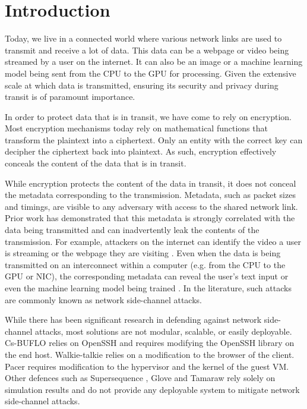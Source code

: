 
\chapter{Introduction}
\label{ch:Introduction}

Today, we live in a connected world where various network links are used to transmit and receive a lot of data. 
This data can be a webpage or video being streamed by a user on the internet. 
It can also be an image or a machine learning model being sent from the CPU to the GPU for processing. 
Given the extensive scale at which data is transmitted, ensuring its security and privacy during transit is of paramount importance.

In order to protect data that is in transit, we have come to rely on encryption. 
Most encryption mechanisms today rely on mathematical functions that transform the plaintext into a ciphertext. 
Only an entity with the correct key can decipher the ciphertext back into plaintext. 
As such, encryption effectively conceals the content of the data that is in transit.

While encryption protects the content of the data in transit, it does not conceal the metadata corresponding to the transmission.
Metadata, such as packet sizes and timings, are visible to any adversary with access to the shared network link.
Prior work has demonstrated that this metadata is strongly correlated with the data being transmitted and can inadvertently leak the contents of the transmission.
For example, attackers on the internet can identify the video a user is streaming \cite{schuster2017beautyburst} or the webpage they are visiting \cite{gong2010fingerprinting, wang2014supersequence}.
Even when the data is being transmitted on an interconnect within a computer (e.g. from the CPU to the GPU or NIC), the corresponding metadata can reveal the user's text input or even the machine learning model being trained \cite{tan2021invisible}.
In the literature, such attacks are commonly known as network side-channel attacks.

While there has been significant research in defending against network side-channel attacks, most solutions are not modular, scalable, or easily deployable.
Cs-BUFLO \cite{cai2014csbuflo} relies on OpenSSH and requires modifying the OpenSSH library on the end host. 
Walkie-talkie \cite{wang2017walkie} relies on a modification to the browser of the client.
Pacer \cite{mehta2022pacer} requires modification to the hypervisor and the kernel of the guest VM.
Other defences such as Supersequence \cite{wang2014supersequence}, Glove \cite{nithyanand2014glove} and Tamaraw \cite{cai2014tamaraw} rely solely on simulation results and do not provide any deployable system to mitigate network side-channel attacks.

